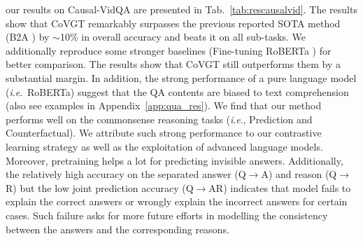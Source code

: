 \documentclass[10pt,journal,compsoc]{IEEEtran}
\newcommand{\ie}{\textit{i}.\textit{e}.}
\begin{document}
our results on Causal-VidQA \cite{li2022representation} are presented in Tab.~\ref{tab:rescausalvid}. The results show that CoVGT remarkably surpasses the previous reported SOTA method (B2A \cite{park2021bridge}) by $\sim$10\% in overall accuracy and beats it on all sub-tasks. We additionally reproduce some stronger baselines (Fine-tuning RoBERTa \cite{liu2019roberta}) for better comparison. The results show that CoVGT still outperforms them by a substantial margin. In addition, the strong performance of a pure language model (\ie~RoBERTa) suggest that the QA contents are biased to text comprehension (also see examples in Appendix~\ref{app:qua_res}). We find that our method performs well on the commonsense reasoning tasks (\ie, Prediction and Counterfactual). We attribute such strong performance to our contrastive learning strategy as well as the exploitation of advanced language models. Moreover, pretraining helps a lot for predicting invisible answers. Additionally, the relatively high accuracy on the separated answer (Q$\rightarrow$A) and reason (Q$\rightarrow$R) but the low joint prediction accuracy (Q$\rightarrow$AR) indicates that model fails to explain the correct answers or wrongly explain the incorrect answers for certain cases. Such failure asks for more future efforts in modelling the consistency between the answers and the corresponding reasons. 
\setlength{\tabcolsep}{3pt}
\end{document}
